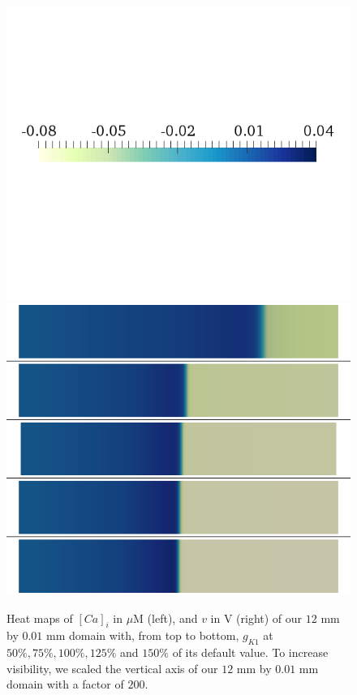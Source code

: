 \documentclass[12pt,a4paper]{article}
\begin{document}
\begin{figure}
\begin{minipage}{0.5\textwidth}
\includegraphics[trim=0cm 7cm 0cm 6cm, clip=true, width=1\linewidth]{legend_v2}
\includegraphics[trim=0cm 0cm 0cm 0cm, clip=true, width=1\linewidth]{v_gk1}
    \end{minipage}
    \caption{Heat maps of $[Ca]_i$ in $\mu$M (left), and $v$ in V (right) of our $12$ mm by $0.01$ mm domain with, from top to bottom, $g_{K1}$ at $50\%, 75\%, 100\%, 125\%$ and $150\%$ of its default value. To increase visibility, we scaled the vertical axis of our $12$ mm by $0.01$ mm domain with a factor of $200$.}
    \label{fig:1d}
\end{figure}
%
%
\end{document}
